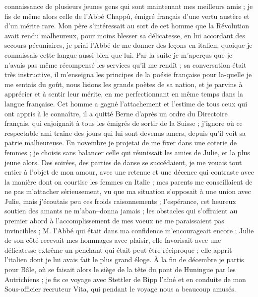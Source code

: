 \documentclass[12pt]{article}
\begin{document}
 connaissance de plusieurs jeunes gens qui sont
maintenant mes meilleurs amis ; je fis de même alors celle de l’Abbé Chappû, émigré français d’une
vertu austère et d’un mérite rare. Mon père s’intéressait au sort de cet homme que la Révolution
avait rendu malheureux, pour moins blesser sa délicatesse, en lui accordant des secours pécuniaires,
je priai l’Abbé de me donner des leçons en italien, quoique je connaissais cette langue aussi bien
que lui. Par la suite je m’aperçus que je n’avais pas même récompensé les services qu’il me rendît ;
sa conversation était très instructive, il m’enseigna les principes de la poésie française pour
la-quelle je me sentais du goût, nous lisions les grands poètes de sa nation, et je parvins à
apprécier et à sentir leur mérite, en me perfectionnant en même temps dans la langue française. Cet
homme a gagné l’attachement et l’estime de tous ceux qui ont appris à le connaître, il a quitté
Berne d’après un ordre du Directoire français, qui enjoignait à tous les émigrés de sortir de la
Suisse ; j’ignore où ce respectable ami traîne des jours qui lui sont devenus amers, depuis qu’il
voit sa patrie malheureuse. En novembre je projetai de me fixer dans une coterie de femmes ; je
choisis sans balancer celle qui réunissait les amies de Julie, et la plus jeune alors. Des soirées,
des parties de danse se succédaient, je me vouais tout entier à l’objet de mon amour, avec une
retenue et une décence qui contraste avec la manière dont on courtise les femmes en Italie ; mes
parents me conseillaient de ne pas m’attacher sérieusement, vu que ma situation s’opposait à une
union avec Julie, mais j’écoutais peu ces froids raisonnements ; l’espérance, cet heureux soutien
des amants ne m’aban–donna jamais ; les obstacles qui s’offraient au premier abord à
l’accomplissement de mes voeux ne me paraissaient pas invincibles ; M. l’Abbé qui était dans ma
confidence m’encourageait encore ; Julie de son côté recevait mes hommages avec plaisir, elle
favorisait avec une délicatesse extrême un penchant qui était peut-être réciproque ; elle apprit
l’italien dont je lui avais fait le plus grand éloge. À la fin de décembre je partis pour Bâle, où
se faisait alors le siège de la tête du pont de Huningue par les Autrichiens ; je fis ce voyage avec
Stettler de Bipp l’aîné et en conduite de mon Sous-officier recruteur Vita, qui pendant le voyage
nous a beaucoup amusés.
\end{document}
